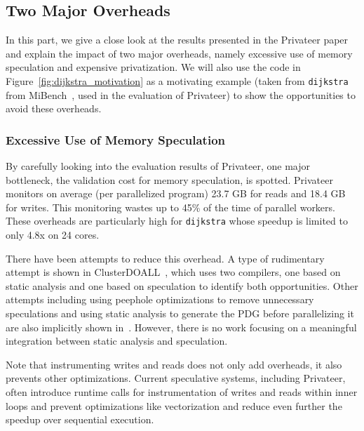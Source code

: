 \subsection{Two Major Overheads}
In this part, we give a close look at the results presented in the
Privateer paper and explain the impact of two major overheads, namely
excessive use of memory speculation and expensive privatization. We will
also use the code in Figure~\ref{fig:dijkstra_motivation} as a motivating
example (taken from \texttt{dijkstra} from MiBench~\cite{}, used in the
evaluation of Privateer) to show the opportunities to avoid these overheads.


\subsubsection{Excessive Use of Memory Speculation}

By carefully looking into the evaluation results of Privateer, one major
bottleneck, the validation cost for memory speculation, is spotted.
%
Privateer monitors on average (per parallelized program) 23.7 GB for reads
and 18.4 GB for writes. This monitoring wastes up to 45\% of the time of
parallel workers.
%
These overheads are particularly high for \texttt{dijkstra} whose
speedup is limited to only 4.8x on 24 cores.

There have been attempts to reduce this overhead. A type of rudimentary
attempt is shown in ClusterDOALL~\cite{kim:12:cgo}, which uses two
compilers, one based on static analysis and one based on speculation to
identify both opportunities. Other attempts including using peephole
optimizations to remove unnecessary speculations and using static analysis
to generate the PDG before parallelizing it are also implicitly shown
in~\cite{johnson:12:pldi,ctian:2008:micro}. However, there is no work
focusing on a meaningful integration between static analysis and
speculation.

Note that instrumenting writes and reads does not only add overheads, it
also prevents other optimizations. Current speculative systems, including
Privateer, often introduce runtime calls for instrumentation of writes and
reads within inner loops and prevent optimizations like vectorization and
reduce even further the speedup over sequential execution.

